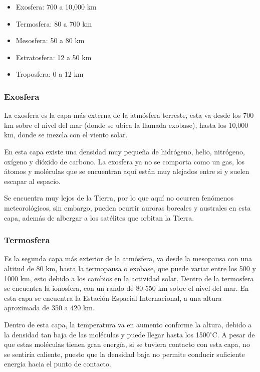 \documentclass{article}
\begin{document}
\begin{itemize}
\item Exosfera: 700 a 10,000 km 
\item Termosfera: 80 a 700 km 
\item Mesosfera: 50 a 80 km
\item Estratosfera: 12 a 50 km 
\item Troposfera: 0 a 12 km 
\end{itemize}


\subsubsection {Exosfera}

La exosfera es la capa más externa de la atmósfera terreste, esta va desde los 700 km sobre el nivel del mar (donde se ubica la llamada exobase), hasta los 10,000 km, donde se mezcla con el viento solar. 

En esta capa existe una densidad muy pequeña de hidrógeno, helio, nitrógeno, oxígeno y dióxido de carbono. La exosfera ya no se comporta como un gas, los átomos y moléculas que se encuentran aquí están muy alejados entre si y suelen escapar al espacio. 

Se encuentra muy lejos de la Tierra, por lo que aquí no ocurren fenómenos meteorológicos, sin embargo, pueden ocurrir auroras boreales y australes en esta capa, además de albergar a los satélites que orbitan la Tierra. 


\subsubsection {Termosfera}

Es la segunda capa más exterior de la atmósfera, va desde la mesopausa con una altitud de 80 km, hasta la termopausa o exobase, que puede variar entre los 500 y 1000 km, esto debido a los cambios en la actividad solar. Dentro de la termosfera se encuentra la ionosfera, con un rando de 80-550 km sobre el nivel del mar. En esta capa se encuentra la Estación Espacial Internacional, a una altura aproximada de 350 a 420 km.

Dentro de esta capa, la temperatura va en aumento conforme la altura, debido a la densidad tan baja de las moléculas y puede llegar hasta los 1500$^\circ$C. A pesar de que estas moléculas tienen gran energía, si se tuviera contacto con esta capa, no se sentiría caliente, puesto que la densidad baja no permite conducir suficiente energia hacia el punto de contacto. 
\end{document}

